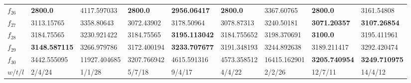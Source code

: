 \begin{table*}[t!]
\begin{tabular}{|p{0.8cm}|p{1.6cm}|p{1.6cm}|p{1.6cm}|p{1.6cm}|p{1.6cm}|p{1.6cm}|p{1.6cm}|p{1.6cm}|}
$f_{26}$  & \textbf{2800.0} & 4117.597033 & \textbf{2800.0} & \textbf{2956.06417} & \textbf{2800.0} & 3367.60765 & \textbf{2800.0} & 3161.54808 \\ 
$f_{27}$  & 3113.15765 & 3358.80643 & 3072.43902 & 3178.50964 & 3078.87313 & 3240.50181 & \textbf{3071.20357} & \textbf{3107.26854} \\ 
$f_{28}$  & 3184.75565 & 3230.921422 & 3184.75565 & \textbf{3195.113042} & 3184.755652 & 3198.370691 & \textbf{3100.0} & 3195.411961 \\ 
$f_{29}$  & \textbf{3148.587115} & 3266.979786 & 3172.400194 & \textbf{3233.707677} & 3191.348193 & 3244.892638 & 3189.211417 & 3292.420474 \\ 
$f_{30}$  & 3442.555095 & 11927.404685 & 3207.766942 & 4615.591316 & 4573.358512 & 16415.162901 & \textbf{3205.740954} & \textbf{3249.710975} \\
\hline
$w/t/l$  & 2/4/24 & 1/1/28 & 5/7/18 & 9/4/17 & 4/4/22 & 2/2/26 & 12/7/11 & 14/4/12 \\
\hline

\end{tabular}
\end{table*}

